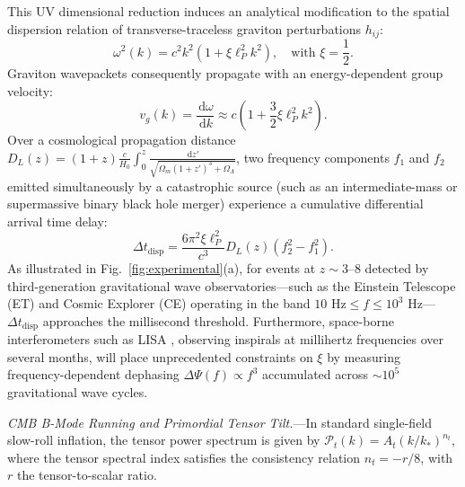 \documentclass[aps,prl,reprint,twocolumn,superscriptaddress,nofootinbib,floatfix]{revtex4-2}
\newcommand{\dif}{\,\mathrm{d}}
\begin{document}
This UV dimensional reduction induces an analytical modification to the spatial dispersion relation of transverse-traceless graviton perturbations $h_{ij}$:
\begin{equation}
    \label{eq:dispersion}
    \omega^2(k) = c^2 k^2 \left( 1 + \xi \ell_P^2 k^2 \right), \quad \text{with } \xi = \frac{1}{2}.
\end{equation}
Graviton wavepackets consequently propagate with an energy-dependent group velocity:
\begin{equation}
    v_g(k) = \frac{\dif \omega}{\dif k} \approx c \left( 1 + \frac{3}{2}\xi \ell_P^2 k^2 \right).
\end{equation}
Over a cosmological propagation distance $D_L(z) = (1+z)\frac{c}{H_0} \int_0^z \frac{\dif z'}{\sqrt{\Omega_m(1+z')^3 + \Omega_\Lambda}}$, two frequency components $f_1$ and $f_2$ emitted simultaneously by a catastrophic source (such as an intermediate-mass or supermassive binary black hole merger) experience a cumulative differential arrival time delay:
\begin{equation}
    \label{eq:delta_t}
    \Delta t_{\mathrm{disp}} = \frac{6 \pi^2 \xi \ell_P^2}{c^3} D_L(z) \left( f_2^2 - f_1^2 \right).
\end{equation}
As illustrated in Fig.~\ref{fig:experimental}(a), for events at $z \sim 3$--$8$ detected by third-generation gravitational wave observatories—such as the Einstein Telescope (ET) \cite{punturo2010einstein} and Cosmic Explorer (CE) \cite{reitze2019cosmic} operating in the band $10\text{ Hz} \le f \le 10^3\text{ Hz}$—$\Delta t_{\mathrm{disp}}$ approaches the millisecond threshold. Furthermore, space-borne interferometers such as LISA \cite{amaro2017laser}, observing inspirals at millihertz frequencies over several months, will place unprecedented constraints on $\xi$ by measuring frequency-dependent dephasing $\Delta \Psi(f) \propto f^3$ accumulated across $\sim 10^5$ gravitational wave cycles.

\emph{CMB B-Mode Running and Primordial Tensor Tilt.}---In standard single-field slow-roll inflation, the tensor power spectrum is given by $\mathcal{P}_t(k) = A_t (k / k_*)^{n_t}$, where the tensor spectral index satisfies the consistency relation $n_t = -r / 8$, with $r$ the tensor-to-scalar ratio.
\end{document}
